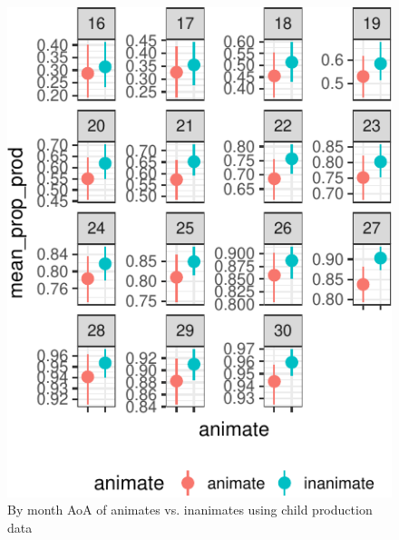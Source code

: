 \documentclass[10pt, letterpaper]{article}
\newenvironment{CodeChunk}{}{}
\begin{document}
\begin{CodeChunk}
\begin{figure}[tb]
\includegraphics{figs/animacy-aoa-prod-1} \caption[By month AoA of animates vs]{By month AoA of animates vs. inanimates using child production data}\label{fig:animacy-aoa-prod}
\end{figure}
\end{CodeChunk}
\end{document}
